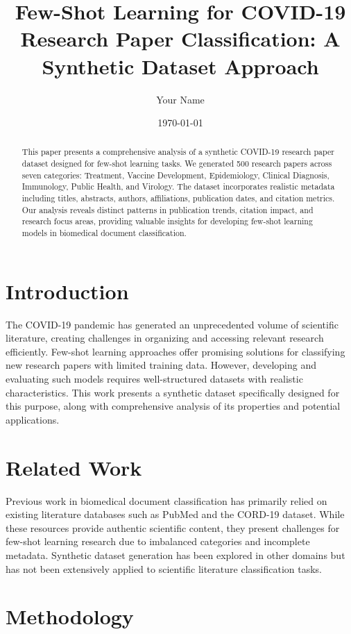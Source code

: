 \documentclass[12pt,a4paper]{article}
\title{Few-Shot Learning for COVID-19 Research Paper Classification: A Synthetic Dataset Approach}
\author{Your Name}
\date{\today}
\begin{document}
\maketitle

\begin{abstract}
This paper presents a comprehensive analysis of a synthetic COVID-19 research paper dataset designed for few-shot learning tasks. We generated 500 research papers across seven categories: Treatment, Vaccine Development, Epidemiology, Clinical Diagnosis, Immunology, Public Health, and Virology. The dataset incorporates realistic metadata including titles, abstracts, authors, affiliations, publication dates, and citation metrics. Our analysis reveals distinct patterns in publication trends, citation impact, and research focus areas, providing valuable insights for developing few-shot learning models in biomedical document classification.
\end{abstract}

\section{Introduction}
The COVID-19 pandemic has generated an unprecedented volume of scientific literature, creating challenges in organizing and accessing relevant research efficiently. Few-shot learning approaches offer promising solutions for classifying new research papers with limited training data. However, developing and evaluating such models requires well-structured datasets with realistic characteristics. This work presents a synthetic dataset specifically designed for this purpose, along with comprehensive analysis of its properties and potential applications.

\section{Related Work}
Previous work in biomedical document classification has primarily relied on existing literature databases such as PubMed and the CORD-19 dataset. While these resources provide authentic scientific content, they present challenges for few-shot learning research due to imbalanced categories and incomplete metadata. Synthetic dataset generation has been explored in other domains but has not been extensively applied to scientific literature classification tasks.

\section{Methodology}
\end{document}
